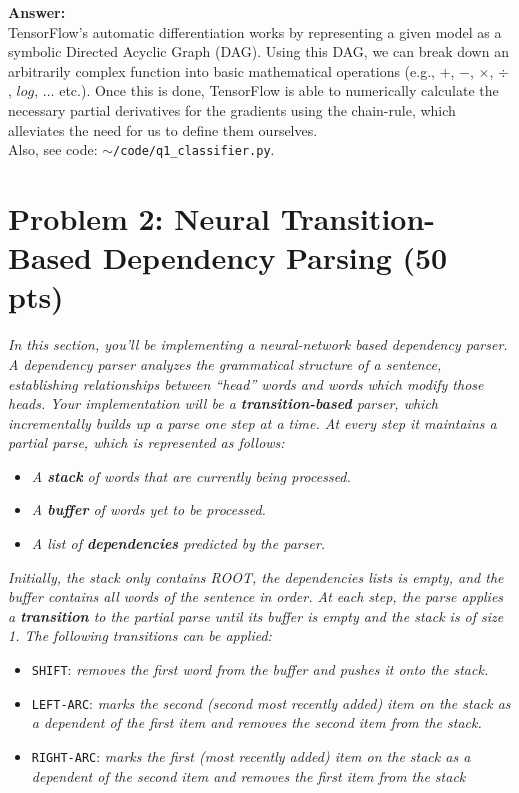 \documentclass[fleqn]{MJD}
\newcommand{\problem}[1]{\chapter{Problem #1}}
\newcommand{\0}{\emptyset}
\begin{document}
\noindent \textbf{Answer:} \\

\noindent TensorFlow's automatic differentiation works by representing a given model as a symbolic Directed Acyclic Graph (DAG). Using this DAG, we can break down an arbitrarily complex function into basic mathematical operations (e.g., $+$, $-$, $\times$, $\div$, $log$, $\dots$ etc.). Once this is done, TensorFlow is able to numerically calculate the necessary partial derivatives for the gradients using the chain-rule, which alleviates the need for us to define them ourselves. \\


\noindent Also, see code: $\sim$\verb|/code/q1_classifier.py|.





\newpage

\problem{2: Neural Transition-Based Dependency Parsing (50 pts)}
\textit{In this section, you’ll be implementing a neural-network based dependency parser. A dependency parser analyzes the grammatical structure of a sentence, establishing relationships between ``head'' words and words which modify those heads. Your implementation will be a \textbf{transition-based} parser, which incrementally builds up a parse one step at a time. At every step it maintains a partial parse, which is represented as follows:} 

\begin{itemize}
	\item \textit{A \textbf{stack} of words that are currently being processed.}
	\item \textit{A \textbf{buffer} of words yet to be processed.}
	\item \textit{A list of \textbf{dependencies} predicted by the parser.}
\end{itemize}

\noindent \textit{Initially, the stack only contains ROOT, the dependencies lists is empty, and the buffer contains all words of the sentence in order. At each step, the parse applies a \textbf{transition} to the partial parse until its buffer is empty and the stack is of size 1. The following transitions can be applied:}

\begin{itemize}
	\item \verb|SHIFT|: \textit{removes the first word from the buffer and pushes it onto the stack.}
	\item \verb|LEFT-ARC|: \textit{marks the second (second most recently added) item on the stack as a dependent of the	first item and removes the second item from the stack.}
	\item \verb|RIGHT-ARC|: \textit{marks the first (most recently added) item on the stack as a dependent of the second item and removes the first item from the stack}
\end{itemize}
\end{document}
